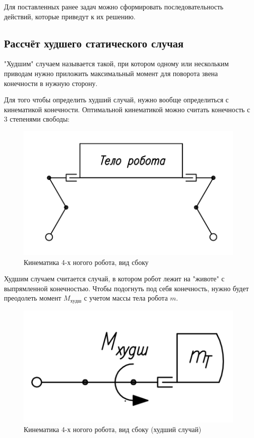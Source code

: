 Для поставленных ранее задач можно сформировать последовательность действий, которые приведут к их решению.

\subsection{Рассчёт худшего статического случая}

"Худшим" случаем называется такой, при котором одному или нескольким приводам нужно приложить максимальный момент для поворота звена конечности в нужную сторону.

Для того чтобы определить худший случай, нужно вообще определиться с кинематикой конечности. Оптимальной кинематикой можно считать конечность с 3 степенями свободы:

\begin{figure}[ht]
    \centering
    \includegraphics[scale=0.7]{kin1.png}
    \caption{Кинематика 4-х ногого робота, вид сбоку}
\end{figure}

Худшим случаем считается случай, в котором робот лежит на "животе" с выпрямленной конечностью. Чтобы подогнуть под себя конечность, нужно будет преодолеть момент $M_{худш}$ с учетом массы тела робота $m$.

\begin{figure}[ht]
    \centering
    \includegraphics[scale=1]{kin2.png}
    \caption{Кинематика 4-х ногого робота, вид сбоку (худший случай)}
\end{figure}

